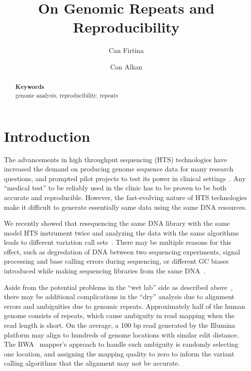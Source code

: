 \documentclass[10pt,a4paper]{article}
\date{}
\def\keywords#1{\begin{center}{\bf Keywords}\\{#1}\end{center}}
\def\titulo#1{\title{#1}}
\begin{document}
\titulo{On Genomic Repeats and Reproducibility}

\author[1]{Can Firtina}
\author[1]{Can Alkan}

\maketitle
\thispagestyle{empty}


\begin{abstract}

\keywords{genome analysis, reproducibility, repeats}
\end{abstract}

\section{Introduction}
The advancements in high throughput sequencing (HTS) technologies have increased the demand on producing genome sequence data for many research questions, and prompted pilot projects to test its
power in clinical settings~\cite{Biesecker2009}. Any ``medical test'' to be reliably used in the clinic has to be proven to be both accurate and reproducible.
However, the fast-evolving nature of HTS technologies make it difficult to generate essentially same data using the same DNA resources. 

We recently showed that resequencing the same DNA library 
with the same model HTS instrument twice and analyzing the data with the same algorithms leads to different variation call sets~\cite{Kavak2015}. There may be multiple reasons for this effect,
such as degredation of DNA between two sequencing experiments, signal processing and base calling errors during sequencing, or different GC biases introduced while making sequencing libraries from the
same DNA~\cite{Kavak2015}. 

Aside from the potential problems in the ``wet lab'' side as described above~\cite{Kavak2015}, 
there may be additional complications in the ``dry'' analysis due to alignment errors and ambiguities due to genomic repeats.
Approximately half of the human genome consists of repeats, which cause ambiguity in read mapping when the read length is short. On the average, a 100 bp read generated by the Illumina platform may align to hundreds of genome locations with similar edit distance. 
The BWA~\cite{Li2009a} mapper's  approach to handle such ambiguity is randomly selecting one location, and assigning the mapping quality to zero to inform the variant calling algorithms that the alignment may not be accurate. 
\end{document}
